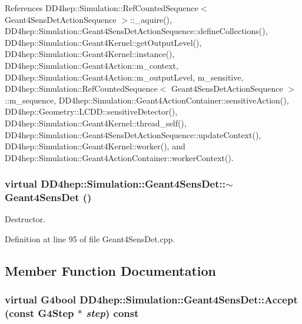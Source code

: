 References DD4hep::Simulation::RefCountedSequence$<$ Geant4SensDetActionSequence $>$::\_\-aquire(), DD4hep::Simulation::Geant4SensDetActionSequence::defineCollections(), DD4hep::Simulation::Geant4Kernel::getOutputLevel(), DD4hep::Simulation::Geant4Kernel::instance(), DD4hep::Simulation::Geant4Action::m\_\-context, DD4hep::Simulation::Geant4Action::m\_\-outputLevel, m\_\-sensitive, DD4hep::Simulation::RefCountedSequence$<$ Geant4SensDetActionSequence $>$::m\_\-sequence, DD4hep::Simulation::Geant4ActionContainer::sensitiveAction(), DD4hep::Geometry::LCDD::sensitiveDetector(), DD4hep::Simulation::Geant4Kernel::thread\_\-self(), DD4hep::Simulation::Geant4SensDetActionSequence::updateContext(), DD4hep::Simulation::Geant4Kernel::worker(), and DD4hep::Simulation::Geant4ActionContainer::workerContext().\hypertarget{class_d_d4hep_1_1_simulation_1_1_geant4_sens_det_a29286fa61cf355cd3572e73bf5e77204}{
\subsubsection[{$\sim$Geant4SensDet}]{\setlength{\rightskip}{0pt plus 5cm}virtual DD4hep::Simulation::Geant4SensDet::$\sim$Geant4SensDet ()}}
\label{class_d_d4hep_1_1_simulation_1_1_geant4_sens_det_a29286fa61cf355cd3572e73bf5e77204}


Destructor. 

Definition at line 95 of file Geant4SensDet.cpp.

\subsection{Member Function Documentation}
\hypertarget{class_d_d4hep_1_1_simulation_1_1_geant4_sens_det_a3b7e7be391162d604279c2e52a46d1df}{
\subsubsection[{Accept}]{\setlength{\rightskip}{0pt plus 5cm}virtual G4bool DD4hep::Simulation::Geant4SensDet::Accept (const G4Step $\ast$ {\em step}) const}}
\label{class_d_d4hep_1_1_simulation_1_1_geant4_sens_det_a3b7e7be391162d604279c2e52a46d1df}



